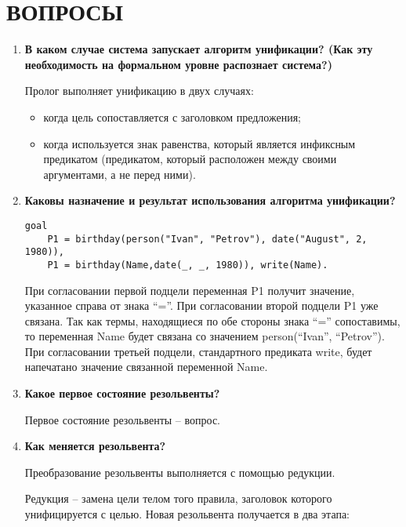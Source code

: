 \section{ВОПРОСЫ}

\begin{enumerate}
    \item \textbf{В каком случае система запускает алгоритм унификации? (Как эту необходимость на формальном уровне распознает система?)}

        Пролог выполняет унификацию в двух случаях:

        \begin{itemize}
            \item когда цель сопоставляется с заголовком предложения;
            \item когда используется знак равенства, который является инфиксным предикатом (предикатом, который расположен между своими аргументами, а не перед ними).
        \end{itemize}

    \item \textbf{Каковы назначение и результат использования алгоритма унификации? }

\begin{lstlisting}
goal
    P1 = birthday(person("Ivan", "Petrov"), date("August", 2, 1980)),
    P1 = birthday(Name,date(_, _, 1980)), write(Name).
\end{lstlisting}

        При согласовании первой подцели переменная P1 получит значение, указанное справа от знака ``=''. При согласовании второй подцели P1 уже связана. Так как термы, находящиеся по обе стороны знака ``='' сопоставимы, то переменная Name будет связана со значением person(``Ivan'', ``Petrov''). При согласовании третьей подцели, стандартного предиката write, будет напечатано значение связанной переменной Name.

    \item \textbf{Какое первое состояние резольвенты?}

        Первое состояние резольвенты -- вопрос.

    \item \textbf{Как меняется резольвента?}

        Преобразование резольвенты выполняется с помощью редукции.

        Редукция -- замена цели телом того правила, заголовок которого унифицируется с целью.
        Новая резольвента получается в два этапа:


\end{enumerate}

